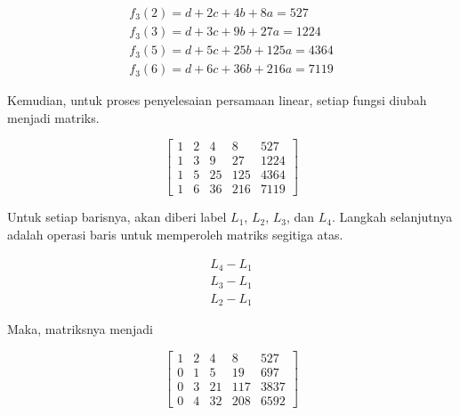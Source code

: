 \begin{gather*}
	f_3(2) = d + 2c + 4b + 8a = 527 \\
	f_3(3) = d + 3c + 9b + 27a = 1224 \\
	f_3(5) = d + 5c + 25b + 125a = 4364 \\
	f_3(6) = d + 6c + 36b + 216a = 7119
\end{gather*}

Kemudian, untuk proses penyelesaian persamaan linear, setiap fungsi diubah menjadi matriks.

\begin{center}
	\setlength\arraycolsep{15pt}
	\[
	\begin{bmatrix}
			1 	& 2 	& 4 	& 8 		& 527 		\\[1em]
			1 	& 3 	& 9 	& 27 		& 1224		\\[1em]
			1 	& 5 	& 25 	& 125 	& 4364		\\[1em]
			1 	& 6 	& 36 	& 216 	& 7119
	\end{bmatrix}
	\]
\end{center}

Untuk setiap barisnya, akan diberi label \begin{math}L_1\end{math}, \begin{math}L_2\end{math}, \begin{math}L_3\end{math}, dan \begin{math}L_4\end{math}. Langkah selanjutnya adalah operasi baris untuk memperoleh matriks segitiga atas.

\begin{align*}
	L_4 - L_1 \\
	L_3 - L_1 \\
	L_2 - L_1
\end{align*}

Maka, matriksnya menjadi

\begin{center}
	\setlength\arraycolsep{15pt}
	\[
	\begin{bmatrix}
			1 	& 2 	& 4 	& 8 		& 527 		\\[1em]
			0 	& 1 	& 5 	& 19 		& 697			\\[1em]
			0 	& 3 	& 21 	& 117		& 3837		\\[1em]
			0 	& 4 	& 32 	& 208 	& 6592
	\end{bmatrix}
	\]
\end{center}

